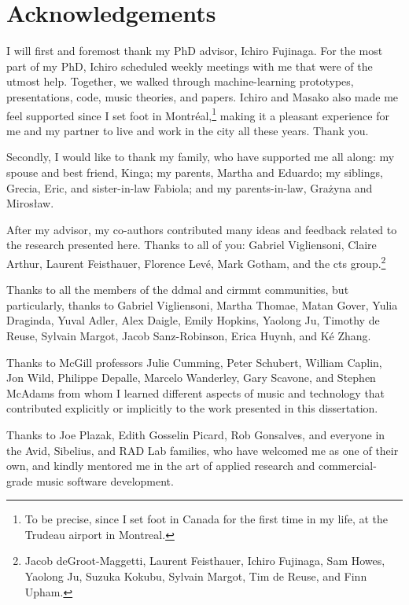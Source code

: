 \chapter*{Acknowledgements}
\label{chap:acknowledgements}

I will first and foremost thank my PhD advisor, Ichiro
Fujinaga. For the most part of my PhD, Ichiro scheduled
weekly meetings with me that were of the utmost help.
Together, we walked through machine-learning prototypes,
presentations, code, music theories, and papers. Ichiro and
Masako also made me feel supported since I set foot in
Montr\'eal,\footnote{To be precise, since I set foot in
Canada for the first time in my life, at the Trudeau airport
in Montreal.} making it a pleasant experience for me and my
partner to live and work in the city all these years. Thank
you.

Secondly, I would like to thank my family, who have
supported me all along: my spouse and best friend, Kinga; my
parents, Martha and Eduardo; my siblings, Grecia, Eric, and
sister-in-law Fabiola; and my parents-in-law, Gra\.zyna and
Miros\l{}aw.

After my advisor, my co-authors contributed many ideas and
feedback related to the research presented here. Thanks to
all of you: Gabriel Vigliensoni, Claire Arthur, Laurent
Feisthauer, Florence Lev\'e, Mark Gotham, and the \gls{cts}
group.\footnote{Jacob deGroot-Maggetti, Laurent Feisthauer,
Ichiro Fujinaga, Sam Howes, Yaolong Ju, Suzuka Kokubu,
Sylvain Margot, Tim de Reuse, and Finn Upham.}

Thanks to all the members of the \gls{ddmal} and
\gls{cirmmt} communities, but particularly, thanks to
Gabriel Vigliensoni, Martha Thomae, Matan Gover, Yulia
Draginda, Yuval Adler, Alex Daigle, Emily Hopkins, Yaolong
Ju, Timothy de Reuse, Sylvain Margot, Jacob Sanz-Robinson,
Erica Huynh, and K\'e Zhang.

Thanks to McGill professors Julie Cumming, Peter Schubert,
William Caplin, Jon Wild, Philippe Depalle, Marcelo
Wanderley, Gary Scavone, and Stephen McAdams from whom I
learned different aspects of music and technology that
contributed explicitly or implicitly to the work presented
in this dissertation.

Thanks to Joe Plazak, Edith Gosselin Picard, Rob Gonsalves,
and everyone in the Avid, Sibelius, and RAD Lab families,
who have welcomed me as one of their own, and kindly
mentored me in the art of applied research and
commercial-grade music software development.

